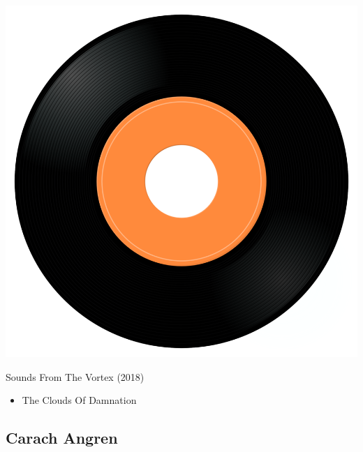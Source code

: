 \begin{minipage}[t]{0.25\textwidth}
\captionsetup{type=figure}
\includegraphics[width=\textwidth]{Images/cover.png}
\caption*{Sounds From The Vortex (2018)}
\end{minipage}
\begin{minipage}[t]{0.25\textwidth}\vspace{0pt}
\begin{itemize}[nosep,leftmargin=1em,labelwidth=*,align=left]
	\setlength{\itemsep}{0pt}
	\item The Clouds Of Damnation
\end{itemize}
\end{minipage}

\subsection{Carach Angren}

